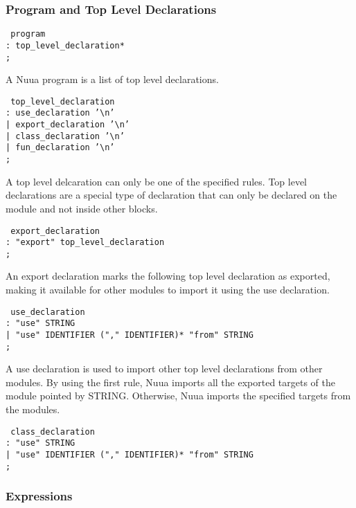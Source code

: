 \subsubsection{Program and Top Level Declarations}

\texttt{
    program\\
        \tab: top\_level\_declaration*\\
        \tab;
}

A Nuua program is a list of top level declarations.

\texttt{
    top\_level\_declaration\\
        \tab: use\_declaration '\textbackslash n'\\
        \tab| export\_declaration '\textbackslash n'\\
        \tab| class\_declaration '\textbackslash n'\\
        \tab| fun\_declaration '\textbackslash n'\\
        \tab;
}

A top level delcaration can only be one of the specified rules. Top level declarations are a
special type of declaration that can only be declared on the module and not inside other blocks.

\texttt{
    export\_declaration\\
        \tab: "export" top\_level\_declaration\\
        \tab;
}

An export declaration marks the following top level declaration as exported, making it available for other modules to import it using the
use declaration.

\texttt{
    use\_declaration\\
        \tab: "use" STRING\\
        \tab| "use" IDENTIFIER ("," IDENTIFIER)* "from" STRING\\
        \tab;
}

A use declaration is used to import other top level declarations from other modules. By using the first rule, Nuua imports all the
exported targets of the module pointed by STRING. Otherwise, Nuua imports the specified targets from the modules.

\texttt{
    class\_declaration\\
        \tab: "use" STRING\\
        \tab| "use" IDENTIFIER ("," IDENTIFIER)* "from" STRING\\
        \tab;
}

\subsubsection{Expressions}

